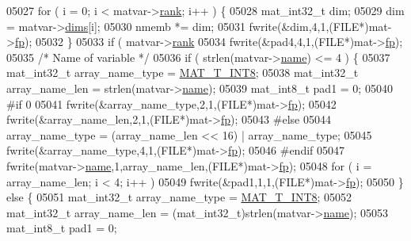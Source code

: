 \begin{DoxyCode}
{{{{{{{{{{{{{{{{{{{{{{{{{{{{{{05027         \textcolor{keywordflow}{for} ( i = 0; i < matvar->\hyperlink{group___m_a_t_a84ba70c96ded13cc555fa75b768d9921}{rank}; i++ ) \{
05028             mat\_int32\_t dim;
05029             dim = matvar->\hyperlink{group___m_a_t_a8e01234e1c862ce3472bb37f5a09b92c}{dims}[i];
05030             nmemb *= dim;
05031             fwrite(&dim,4,1,(FILE*)mat->\hyperlink{struct__mat__t_a85f562e407ca9ad4d2a6e14f839432b7}{fp});
05032         \}
05033         \textcolor{keywordflow}{if} ( matvar->\hyperlink{group___m_a_t_a84ba70c96ded13cc555fa75b768d9921}{rank} %
05034             fwrite(&pad4,4,1,(FILE*)mat->\hyperlink{struct__mat__t_a85f562e407ca9ad4d2a6e14f839432b7}{fp});
05035         \textcolor{comment}{/* Name of variable */}
05036         \textcolor{keywordflow}{if} ( strlen(matvar->\hyperlink{group___m_a_t_a5d4b55b041e3b4fb50c04337f05ad909}{name}) <= 4 ) \{
05037             mat\_int32\_t  array\_name\_type = \hyperlink{group___m_a_t_ggacf7b3b879282b7ab3a51190e49bf3453a9807f5033ed4f9b548953742d9fd1658}{MAT\_T\_INT8};
05038             mat\_int32\_t array\_name\_len   = strlen(matvar->\hyperlink{group___m_a_t_a5d4b55b041e3b4fb50c04337f05ad909}{name});
05039             mat\_int8\_t  pad1 = 0;
05040 \textcolor{preprocessor}{#if 0}
05041             fwrite(&array\_name\_type,2,1,(FILE*)mat->\hyperlink{struct__mat__t_a85f562e407ca9ad4d2a6e14f839432b7}{fp});
05042             fwrite(&array\_name\_len,2,1,(FILE*)mat->\hyperlink{struct__mat__t_a85f562e407ca9ad4d2a6e14f839432b7}{fp});
05043 \textcolor{preprocessor}{#else}
05044             array\_name\_type = (array\_name\_len << 16) | array\_name\_type;
05045             fwrite(&array\_name\_type,4,1,(FILE*)mat->\hyperlink{struct__mat__t_a85f562e407ca9ad4d2a6e14f839432b7}{fp});
05046 \textcolor{preprocessor}{#endif}
05047             fwrite(matvar->\hyperlink{group___m_a_t_a5d4b55b041e3b4fb50c04337f05ad909}{name},1,array\_name\_len,(FILE*)mat->\hyperlink{struct__mat__t_a85f562e407ca9ad4d2a6e14f839432b7}{fp});
05048             \textcolor{keywordflow}{for} ( i = array\_name\_len; i < 4; i++ )
05049                 fwrite(&pad1,1,1,(FILE*)mat->\hyperlink{struct__mat__t_a85f562e407ca9ad4d2a6e14f839432b7}{fp});
05050         \} \textcolor{keywordflow}{else} \{
05051             mat\_int32\_t array\_name\_type = \hyperlink{group___m_a_t_ggacf7b3b879282b7ab3a51190e49bf3453a9807f5033ed4f9b548953742d9fd1658}{MAT\_T\_INT8};
05052             mat\_int32\_t array\_name\_len  = (mat\_int32\_t)strlen(matvar->\hyperlink{group___m_a_t_a5d4b55b041e3b4fb50c04337f05ad909}{name});
05053             mat\_int8\_t  pad1 = 0;
}}}}}}}}}}}}}}}}}}}}}}}}}}}}}}
\end{DoxyCode}
